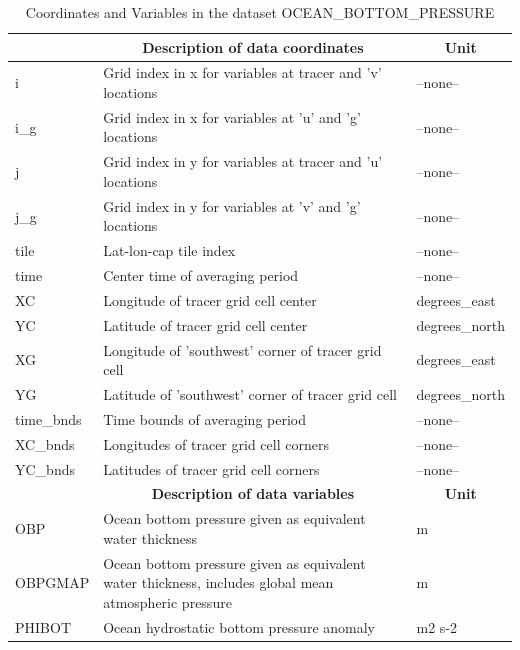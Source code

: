 \begin{longtable}{|m{}|m{}|m{}|}
\caption{Coordinates and Variables in the dataset OCEAN\_BOTTOM\_PRESSURE}
\label{tab:table-OCEAN_BOTTOM_PRESSURE-fields} \\ 
\hline \endhead \hline \endfoot
\rowcolor{lightgray} \multicolumn{1}{|c|}{\textbf{Coordinates}} & \multicolumn{1}{|c|}{\textbf{Description of data coordinates}} &  \multicolumn{1}{|c|}{\textbf{Unit}}\\ \hline
i &Grid index in x for variables at tracer and 'v' locations &--none--  \\ \hline
i\_g &Grid index in x for variables at 'u' and 'g' locations &--none--  \\ \hline
j &Grid index in y for variables at tracer and 'u' locations &--none--  \\ \hline
j\_g &Grid index in y for variables at 'v' and 'g' locations &--none--  \\ \hline
tile &Lat-lon-cap tile index &--none--  \\ \hline
time &Center time of averaging period &--none--  \\ \hline
XC &Longitude of tracer grid cell center &degrees\_east  \\ \hline
YC &Latitude of tracer grid cell center &degrees\_north  \\ \hline
XG &Longitude of 'southwest' corner of tracer grid cell &degrees\_east  \\ \hline
YG &Latitude of 'southwest' corner of tracer grid cell &degrees\_north  \\ \hline
time\_bnds &Time bounds of averaging period &--none--  \\ \hline
XC\_bnds &Longitudes of tracer grid cell corners &--none--  \\ \hline
YC\_bnds &Latitudes of tracer grid cell corners &--none--  \\ \hline
\rowcolor{lightgray} \multicolumn{1}{|c|}{\textbf{Variables}} & \multicolumn{1}{|c|}{\textbf{Description of data variables}} &  \multicolumn{1}{|c|}{\textbf{Unit}}\\ \hline
OBP &Ocean bottom pressure given as equivalent water thickness &m  \\ \hline
OBPGMAP &Ocean bottom pressure given as equivalent water thickness, includes global mean atmospheric pressure &m  \\ \hline
PHIBOT &Ocean hydrostatic bottom pressure anomaly &m2 s-2  \\ \hline
\end{longtable}

